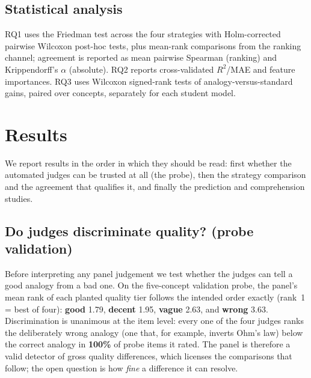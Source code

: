 \documentclass[11pt]{article}
\begin{document}
\subsection{Statistical analysis}
\label{sec:method:stats}
RQ1 uses the Friedman test across the four strategies with Holm-corrected
pairwise Wilcoxon post-hoc tests, plus mean-rank comparisons from the ranking
channel; agreement is reported as mean pairwise Spearman (ranking) and
Krippendorff's $\alpha$ (absolute). RQ2 reports cross-validated $R^2$/MAE and
feature importances. RQ3 uses Wilcoxon signed-rank tests of analogy-versus-standard
gains, paired over concepts, separately for each student model.

\section{Results}
\label{sec:results}
We report results in the order in which they should be read: first whether the automated
judges can be trusted at all (the probe), then the strategy comparison and the agreement
that qualifies it, and finally the prediction and comprehension studies.

\subsection{Do judges discriminate quality? (probe validation)}
\label{sec:results:probe}
Before interpreting any panel judgement we test whether the judges can tell a good analogy
from a bad one. On the five-concept validation probe, the panel's mean rank of each planted
quality tier follows the intended order exactly (rank~1 = best of four): \textbf{good}
1.79, \textbf{decent} 1.95, \textbf{vague} 2.63, and \textbf{wrong} 3.63. Discrimination is
unanimous at the item level: every one of the four judges ranks the deliberately wrong
analogy (one that, for example, inverts Ohm's law) below the correct analogy in
\textbf{100\%} of probe items it rated. The panel is therefore a valid detector of gross
quality differences, which licenses the comparisons that follow; the open question is how
\emph{fine} a difference it can resolve.
\end{document}
